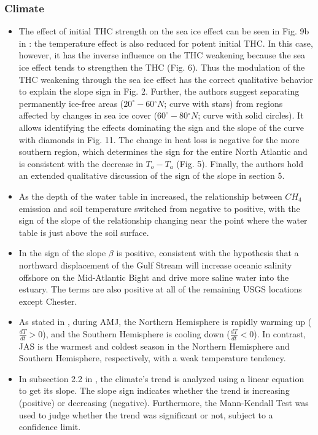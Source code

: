 \documentclass[11pt]{book}
\begin{document}
\subsubsection{Climate}
\begin{itemize}
\item The effect of initial THC strength on the sea ice effect can be seen
in Fig. 9b in \cite{levermann2007role}:
the temperature effect is also reduced for potent initial THC. In
this case, however, it has the inverse influence on the THC weakening
because the sea ice effect tends to strengthen the THC (Fig. 6). Thus
the modulation of the THC weakening through the sea ice effect has
the correct qualitative behavior to explain the slope sign in Fig.
2. Further, the authors suggest separating permanently ice-free areas
($20^{\circ}-60{}^{\circ}N$; curve with stars)
from regions affected by changes in sea ice cover ($60^{\circ}-80{}^{\circ}N$;
curve with solid circles). It allows identifying the effects dominating
the sign and the slope of the curve with diamonds in Fig. 11. The
change in heat loss is negative for the more southern region, which
determines the sign for the entire North Atlantic and is consistent
with the decrease in $T_{o}-T_{a}$ (Fig. 5). Finally, the authors
hold an extended qualitative discussion of the sign of the slope in
section 5.
\item As the depth of the water table in \cite{mcewing2015environmental}
increased, the relationship between $CH_{4}$ emission and soil temperature
switched from negative to positive, with the sign of the slope of
the relationship changing near the point where the water table is
just above the soil surface.
\item In \cite{ross2015sea}
the sign of the slope $\beta$ is positive, consistent with the hypothesis
that a northward displacement of the Gulf Stream will increase oceanic
salinity offshore on the Mid-Atlantic Bight and drive more saline
water into the estuary. The terms are also positive at all of the
remaining USGS locations except Chester.
\item As stated in \cite{song2018seasonally},
during AMJ, the Northern Hemisphere is rapidly warming up ($\frac{dT}{dt}>0$),
and the Southern Hemisphere is cooling down ($\frac{dT}{dt}<0$).
In contrast, JAS is the warmest and coldest season in the Northern
Hemisphere and Southern Hemisphere, respectively, with a weak temperature
tendency.
\item In subsection 2.2 in \cite{setiawan2021climate},
the climate's trend is analyzed using a linear equation to get its
slope. The slope sign indicates whether the trend is increasing (positive)
or decreasing (negative). Furthermore, the Mann-Kendall Test was used
to judge whether the trend was significant or not, subject to a confidence
limit.
\end{itemize}
\end{document}
